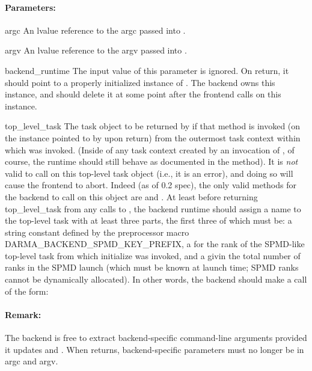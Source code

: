 \paragraph{Parameters:}
\begin{compactdesc} 
\item[argc] An lvalue reference to the argc passed into .
\item[argv] An lvalue reference to the argv passed into .
\item[backend\_runtime] The input value of this parameter is ignored.  On return, it should
   point to a properly initialized instance of .  The backend owns this
   instance, and should delete it at some point after the frontend calls  on
   this instance.
\item[top\_level\_task] The task object to be returned by  if that
   method is invoked (on the instance pointed to by  upon return) from the outermost
   task context within which  was invoked.  (Inside of any task context
   created by an invocation of , of course, the runtime should still behave as documented
   in the  method).  It is \emph{not} valid to call  on this
   top-level task object (i.e., it is an error), and doing so will cause the frontend to abort.
   Indeed (as of 0.2 spec), the only valid methods for the backend to call on this object are
    and .  At least before returning top\_level\_task from any calls to
   , the backend runtime should assign a name to the top-level task
   with at least three parts, the first three of which must be: a string constant defined by the
   preprocessor macro DARMA\_BACKEND\_SPMD\_KEY\_PREFIX, a  for the rank of the SPMD-like
   top-level task from which initialize was invoked, and a  givin the total number of
   ranks in the SPMD launch (which must be known at launch time; SPMD ranks cannot be dynamically
   allocated).  In other words, the backend should make a call of the form:
\end{compactdesc}

\paragraph{Remark:} The backend is free to extract backend-specific command-line arguments provided it
   updates  and .  When  returns, backend-specific parameters
   must no longer be in argc and argv.




